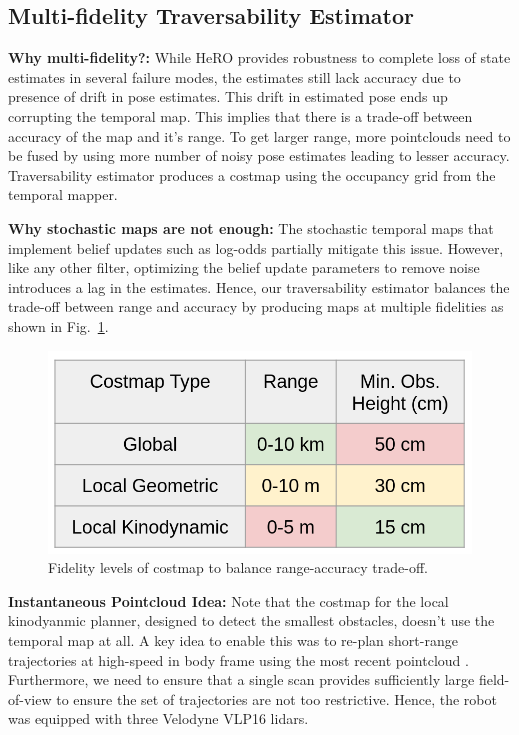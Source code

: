 \documentclass[letterpaper, 10 pt, conference]{ieeeconf}  %
\newcommand{\pr}[1]{\textbf{#1:}}  %
\begin{document}
\subsection{Multi-fidelity Traversability Estimator}

\pr{Why multi-fidelity?} 
While HeRO provides robustness to complete loss of state estimates in several failure modes, the estimates still lack accuracy due to presence of drift in pose estimates.
This drift in estimated pose ends up corrupting the temporal map.
This implies that there is a trade-off between accuracy of the map and it's range.
To get larger range, more pointclouds need to be fused by using more number of noisy pose estimates leading to lesser accuracy. 
Traversability estimator produces a costmap using the occupancy grid from the temporal mapper.

\pr{Why stochastic maps are not enough}
The stochastic temporal maps that implement belief updates such as log-odds \cite{hornung2013octomap} partially mitigate this issue.
However, like any other filter, optimizing the belief update parameters to remove noise introduces a lag in the estimates.
Hence, our traversability estimator balances the trade-off between range and accuracy by producing maps at multiple fidelities as shown in Fig.~\ref{fig:costmap}. 

\begin{figure}[h!]
    \centering
    \includegraphics[width=\linewidth]{Traversability/figs/Costmap.png}
    \caption{Fidelity levels of costmap to balance range-accuracy trade-off.}
    \label{fig:costmap}
\end{figure}

\pr{Instantaneous Pointcloud Idea}
Note that the costmap for the local kinodyanmic planner, designed to detect the smallest obstacles, doesn't use the temporal map at all.
A key idea to enable this was to re-plan short-range trajectories at high-speed in body frame using the most recent pointcloud \cite{instantaneousPointclouds}.
Furthermore, we need to ensure that a single scan provides sufficiently large field-of-view to ensure the set of trajectories are not too restrictive.
Hence, the robot was equipped with three Velodyne VLP16 lidars.
\end{document}

